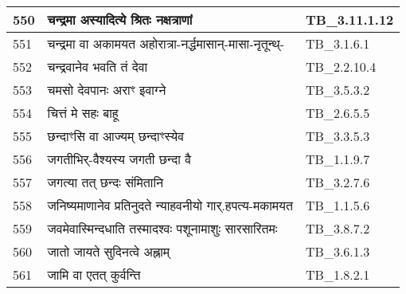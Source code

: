 \documentclass[17pt]{extarticle}
\begin{document}
\begin{longtable}{||p{0.4in}||p{4.9in}||p{0.9in}||}
    \hline
        
    550 & चन्द्रमा अस्यादित्ये श्रितः नक्षत्राणां & TB\_3.11.1.12       \\
    
    \hline
        
    551 & चन्द्रमा वा अकामयत अहोरात्रा{-}नर्द्धमासान्{-}मासा{-}नृतून्थ्{-} & TB\_3.1.6.1       \\
    
    \hline
        
    552 & चन्द्रवानेव भवति तं देवा & TB\_2.2.10.4       \\
    
    \hline
        
    553 & चमसो देवपानः अराꣳ इवाग्ने & TB\_3.5.3.2       \\
    
    \hline
        
    554 & चित्तं मे सहः बाहू & TB\_2.6.5.5       \\
    
    \hline
        
    555 & छन्दाꣳसि वा आज्यम् छन्दाꣳस्येव & TB\_3.3.5.3       \\
    
    \hline
        
    556 & जगतीभिर्{-}वैश्यस्य जगती छन्दा वै & TB\_1.1.9.7       \\
    
    \hline
        
    557 & जगत्या तत् छन्दः संमितानि & TB\_3.2.7.6       \\
    
    \hline
        
    558 & जनिष्यमाणानेव प्रतिनुदते न्याहवनीयो गार्.हपत्य{-}मकामयत & TB\_1.1.5.6       \\
    
    \hline
        
    559 & जवमेवास्मिन्दधाति तस्मादश्वः पशूनामाशुः सारसारितमः & TB\_3.8.7.2       \\
    
    \hline
        
    560 & जातो जायते सुदिनत्वे अह्नाम् & TB\_3.6.1.3       \\
    
    \hline
        
    561 & जामि वा एतत् कुर्वन्ति & TB\_1.8.2.1       \\
    
    \hline
        

\end{longtable}
\end{document}
